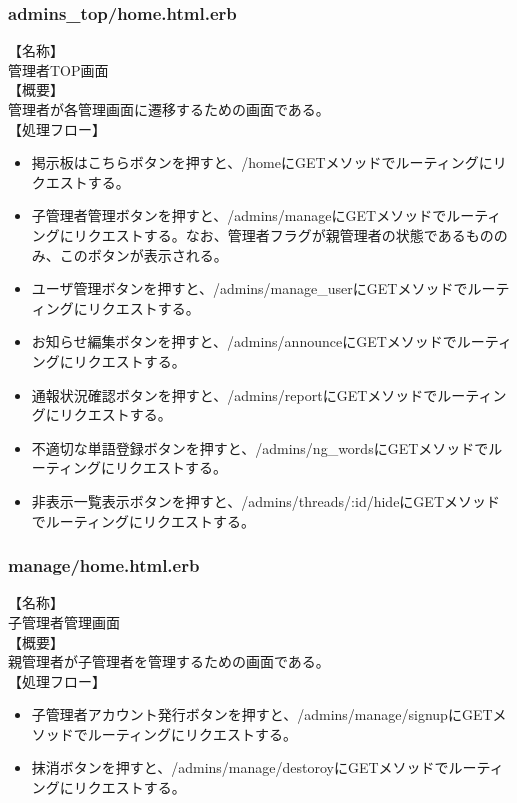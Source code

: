 \documentclass[a4j]{jarticle}
\begin{document}
\subsubsection{admins\_top/home.html.erb}
\noindent
【名称】\\
管理者TOP画面\\
【概要】\\
管理者が各管理画面に遷移するための画面である。\\
【処理フロー】
\begin{itemize}
  \item 掲示板はこちらボタンを押すと、/homeにGETメソッドでルーティングにリクエストする。
  \item 子管理者管理ボタンを押すと、/admins/manageにGETメソッドでルーティングにリクエストする。なお、管理者フラグが親管理者の状態であるもののみ、このボタンが表示される。
  \item ユーザ管理ボタンを押すと、/admins/manage\_userにGETメソッドでルーティングにリクエストする。
  \item お知らせ編集ボタンを押すと、/admins/announceにGETメソッドでルーティングにリクエストする。
  \item 通報状況確認ボタンを押すと、/admins/reportにGETメソッドでルーティングにリクエストする。
  \item 不適切な単語登録ボタンを押すと、/admins/ng\_wordsにGETメソッドでルーティングにリクエストする。
  \item 非表示一覧表示ボタンを押すと、/admins/threads/:id/hideにGETメソッドでルーティングにリクエストする。
\end{itemize}

\subsubsection{manage/home.html.erb}
\noindent
【名称】\\
子管理者管理画面\\
【概要】\\
親管理者が子管理者を管理するための画面である。\\
【処理フロー】
\begin{itemize}
  \item 子管理者アカウント発行ボタンを押すと、/admins/manage/signupにGETメソッドでルーティングにリクエストする。
  \item 抹消ボタンを押すと、/admins/manage/destoroyにGETメソッドでルーティングにリクエストする。
\end{itemize}
\end{document}
